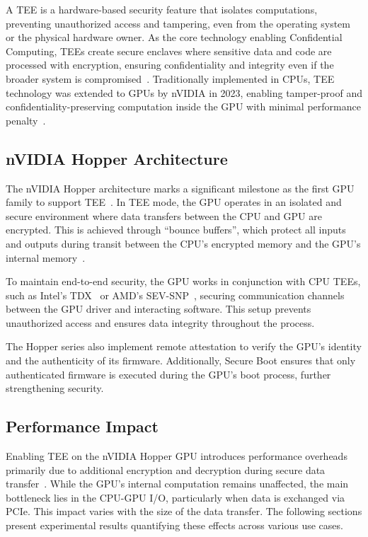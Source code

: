 \documentclass{article}
\begin{document}
A TEE is a hardware-based security feature that isolates computations, preventing unauthorized access and tampering, even from the operating system or the physical hardware owner. As the core technology enabling Confidential Computing, TEEs create secure enclaves where sensitive data and code are processed with encryption, ensuring confidentiality and integrity even if the broader system is compromised~\cite{sabt2015trusted}. Traditionally implemented in CPUs, TEE technology was extended to GPUs by nVIDIA in 2023, enabling tamper-proof and confidentiality-preserving computation inside the GPU with minimal performance penalty~\cite{dhanuskodi2023creating}.

\subsection{nVIDIA Hopper Architecture}

The nVIDIA Hopper architecture marks a significant milestone as the first GPU family to support TEE~\cite{nvidiacc}. In TEE mode, the GPU operates in an isolated and secure environment where data transfers between the CPU and GPU are encrypted. This is achieved through ``bounce buffers'', which protect all inputs and outputs during transit between the CPU’s encrypted memory and the GPU’s internal memory~\cite{dhanuskodi2023creating}.

To maintain end-to-end security, the GPU works in conjunction with CPU TEEs, such as Intel’s TDX~\cite{TDX} or AMD’s SEV-SNP~\cite{SEV-SNP, sev2020strengthening}, securing communication channels between the GPU driver and interacting software. This setup prevents unauthorized access and ensures data integrity throughout the process.

The Hopper series also implement remote attestation to verify the GPU’s identity and the authenticity of its firmware. Additionally, Secure Boot ensures that only authenticated firmware is executed during the GPU’s boot process, further strengthening security.

\subsection{Performance Impact}

Enabling TEE on the nVIDIA Hopper GPU introduces performance overheads primarily due to additional encryption and decryption during secure data transfer~\cite{mohan2024securing}. While the GPU’s internal computation remains unaffected, the main bottleneck lies in the CPU-GPU I/O, particularly when data is exchanged via PCIe. This impact varies with the size of the data transfer. The following sections present experimental results quantifying these effects across various use cases.
\end{document}
